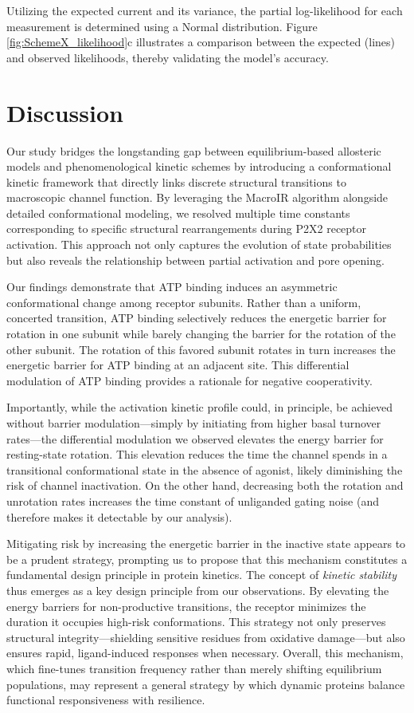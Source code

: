 \documentclass[pdflatex,sn-nature]{sn-jnl}%
\theoremstyle{thmstyleone}%
\theoremstyle{thmstyletwo}%
\theoremstyle{thmstylethree}%
\begin{document}
Utilizing the expected current and its variance, the partial log-likelihood for each measurement is determined using a Normal distribution. Figure \ref{fig:SchemeX_likelihood}c illustrates a comparison between the expected (lines) and observed likelihoods, thereby validating the model's accuracy.

\section{Discussion}
Our study bridges the longstanding gap between equilibrium‐based allosteric models and phenomenological kinetic schemes by introducing a conformational kinetic framework that directly links discrete structural transitions to macroscopic channel function. By leveraging the MacroIR algorithm alongside detailed conformational modeling, we resolved multiple time constants corresponding to specific structural rearrangements during P2X2 receptor activation. This approach not only captures the evolution of state probabilities but also reveals the relationship between partial activation and pore opening.

	
Our findings demonstrate that ATP binding induces an asymmetric conformational change among receptor subunits. Rather than a uniform, concerted transition, ATP binding selectively reduces the energetic barrier for rotation in one subunit while barely changing the barrier for the rotation of the other subunit. The rotation of this favored subunit rotates in turn increases the energetic barrier for ATP binding at an adjacent site. This differential modulation of ATP binding provides a rationale for negative cooperativity. 

Importantly, while the activation kinetic profile could, in principle, be achieved without barrier modulation—simply by initiating from higher basal turnover rates—the differential modulation we observed elevates the energy barrier for resting-state rotation. This elevation reduces the time the channel spends in a transitional conformational state in the absence of agonist, likely diminishing the risk of channel inactivation. On the other hand, decreasing both the rotation and unrotation rates increases the time constant of unliganded gating noise (and therefore makes it detectable by our analysis).
	
Mitigating risk by increasing the energetic barrier in the inactive state appears to be a prudent strategy, prompting us to propose that this mechanism constitutes a fundamental design principle in protein kinetics. The concept of \textit{kinetic stability} thus emerges as a key design principle from our observations. By elevating the energy barriers for non-productive transitions, the receptor minimizes the duration it occupies high-risk conformations. This strategy not only preserves structural integrity---shielding sensitive residues from oxidative damage---but also ensures rapid, ligand-induced responses when necessary. Overall, this mechanism, which fine-tunes transition frequency rather than merely shifting equilibrium populations, may represent a general strategy by which dynamic proteins balance functional responsiveness with resilience.
	
\end{document}

